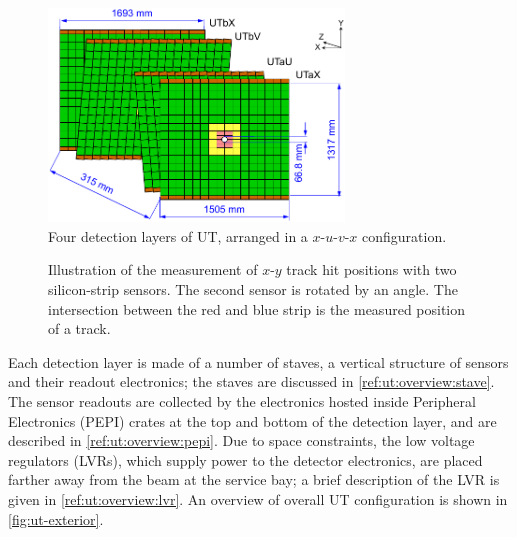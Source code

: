 \begin{figure}[!htb]
    \centering
    \includegraphics[width=0.7\textwidth]{./figs-lhcb-upgrade-overview/tracking/ut_upgrade.pdf}
    \caption{
        Four detection layers of UT,
        arranged in a $x$-$u$-$v$-$x$ configuration.
    }
    \label{fig:ut-layers}
\end{figure}

\begin{figure}[ht]
    \centering
    \resizebox{0.5\columnwidth}{!}{
        
    }
    \caption{
        Illustration of the measurement of $x$-$y$ track hit positions with two
        silicon-strip sensors.
        The second sensor is rotated by an angle.
        The intersection between the red and blue strip is the measured position
        of a track.
    }
    \label{fig:strip-sensor-measurement}
\end{figure}

Each detection layer is made of a number of staves,
a vertical structure of sensors and their readout electronics;
the staves are discussed in \cref{ref:ut:overview:stave}.
The sensor readouts are collected by the electronics hosted inside Peripheral
Electronics (PEPI) crates at the top and bottom of the detection layer,
and are described in \cref{ref:ut:overview:pepi}.
Due to space constraints, the low voltage regulators (LVRs),
which supply power to the detector electronics,
are placed farther away from the beam at the service bay;
a brief description of the LVR is given in \cref{ref:ut:overview:lvr}.
An overview of overall UT configuration is shown in \cref{fig:ut-exterior}.

